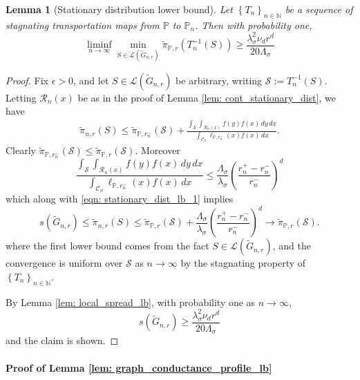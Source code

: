 \documentclass{article}
\newcommand{\seq}[1]{\left\{#1\right\}_{n \in \mathbb{N}}}
\newcommand{\1}{\mathbf{1}}
\newcommand{\Pbb}{\mathbb{P}}
\newcommand{\Sset}{\mathcal{S}}
\newcommand{\Cset}{\mathcal{C}}
\newcommand{\Csig}{\Cset_{\sigma}}
\newcommand{\dx}{\,dx}
\newcommand{\dy}{\,dy}
\newcommand{\piwt}{\widetilde{\pi}}
\theoremstyle{aldenthm}
\newtheorem{lemma}{Lemma}
\theoremstyle{aldenrmrk}
\begin{document}
\begin{lemma}[Stationary distribution lower bound]
	\label{lem: stationary_dist_lb}
	Let $\seq{T_n}$ be a sequence of stagnating transportation maps from $\Pbb$ to $\Pbb_n$. Then with probability one,
	\begin{equation*}
	\liminf_{n \to \infty} \min_{S \in \mathcal{L}(\widetilde{G}_{n,r})} \piwt_{\Pbb,r}(T_n^{-1}(S)) \geq \frac{\lambda_{\sigma}^2 \nu_d r^d}{20\Lambda_{\sigma}}
	\end{equation*}
\end{lemma}
\begin{proof}
	Fix $\epsilon > 0$, and let $S \in \mathcal{L}(\widetilde{G}_{n,r})$ be arbitrary, writing $\Sset := T_n^{-1}(S)$. Letting $\mathcal{R}_n(x)$ be as in the proof of Lemma \ref{lem: cont_stationary_dist}, we have
	\begin{align}
	\widetilde{\pi}_{n,r}(S) \leq \piwt_{\Pbb,r_n^-}(\Sset) + \frac{\int_\Sset \int_{\mathcal{R}_n(x)}  f(y) f(x) \dy \dx}{\int_{\Csig} \ell_{\Pbb,r_n^-}(x) f(x) \dx}. \label{eqn: stationary_dist_lb_1}
	\end{align}
	Clearly $\piwt_{\Pbb,r_n^-}(\Sset) \leq \piwt_{\Pbb,r}(\Sset)$. Moreover
	\begin{equation*}
	\frac{\int_\Sset \int_{\mathcal{R}_n(x)}  f(y) f(x) \dy \dx}{\int_{\Csig} \ell_{\Pbb,r_n^-}(x) f(x) \dx} \leq \frac{\Lambda_{\sigma}}{\lambda_{\sigma}} \left(\frac{r_n^+ - r_n^-}{r_n^-}\right)^d
	\end{equation*}
	which along with \eqref{eqn: stationary_dist_lb_1} implies
	\begin{equation*}
	s(\widetilde{G}_{n,r}) \leq \widetilde{\pi}_{n,r}(S) \leq \piwt_{\Pbb,r}(\Sset) + \frac{\Lambda_{\sigma}}{\lambda_{\sigma}} \left(\frac{r_n^+ - r_n^-}{r_n^-}\right)^d \to \piwt_{\Pbb,r}(\Sset).
	\end{equation*}
	where the first lower bound comes from the fact $S \in \mathcal{L}(\widetilde{G}_{n,r})$, and the convergence is uniform over $\Sset$ as $n \to \infty$ by the stagnating property of $\seq{T_n}$. 
	
	By Lemma \ref{lem: local_spread_lb}, with probability one as $n \to \infty$,
	\begin{equation*}
	s(\widetilde{G}_{n,r}) \geq \frac{\lambda_{\sigma}^2 \nu_d r^d}{20\Lambda_{\sigma}}
	\end{equation*}
	and the claim is shown.
\end{proof}

\paragraph{Proof of Lemma \ref{lem: graph_conductance_profile_lb}}
\end{document}
